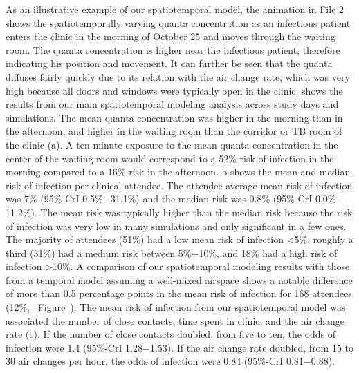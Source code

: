 \documentclass[fleqn,11pt]{wlscirep}
\begin{document}
As an illustrative example of our spatiotemporal model, the animation in \supp File 2 shows the spatiotemporally varying quanta concentration as an infectious patient enters the clinic in the morning of October 25 and moves through the waiting room. The quanta concentration is higher near the infectious patient, therefore indicating his position and movement. It can further be seen that the quanta diffuses fairly quickly due to its relation with the air change rate, which was very high because all doors and windows were typically open in the clinic.  shows the results from our main spatiotemporal modeling analysis across study days and simulations. The mean quanta concentration was higher in the morning than in the afternoon, and higher in the waiting room than the corridor or TB room of the clinic (a). A ten minute exposure to the mean quanta concentration in the center of the waiting room would correspond to a 52\% risk of infection in the morning compared to a 16\% risk in the afternoon. b shows the mean and median risk of infection per clinical attendee. The attendee-average mean risk of infection was 7\% (95\%-CrI 0.5\%$-$31.1\%) and the median risk was 0.8\% (95\%-CrI 0.0\%$-$11.2\%). The mean risk was typically higher than the median risk because the risk of infection was very low in many simulations and only significant in a few ones. The majority of attendees (51\%) had a low mean risk of infection <5\%, roughly a third (31\%) had a medium risk between 5\%$-$10\%, and 18\% had a high risk of infection >10\%. A comparison of our spatiotemporal modeling results with those from a temporal model assuming a well-mixed airspace shows a notable difference of more than 0.5 percentage points in the mean risk of infection for 168 attendees (12\%, \supp~Figure~). The mean risk of infection from our spatiotemporal model was associated the number of close contacts, time spent in clinic, and the air change rate (c). If the number of close contacts doubled, \eg from five to ten, the odds of infection were 1.4 (95\%-CrI 1.28$-$1.53). If the air change rate doubled, \eg from 15 to 30 air changes per hour, the odds of infection were 0.84 (95\%-CrI 0.81$-$0.88). 
\end{document}
